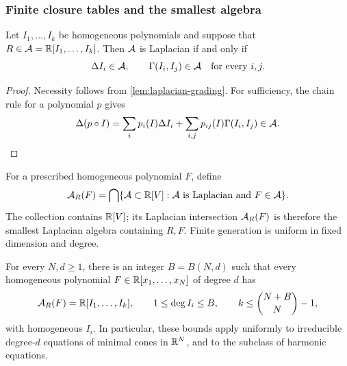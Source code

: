 \subsubsection{Finite closure tables and the smallest algebra}

\begin{proposition}
\label{prop:MR-generator-test}
Let \(I_1,\ldots,I_k\) be homogeneous polynomials and suppose that
\(R\in\mathcal A=\mathbb R[I_1,\ldots,I_k]\). Then \(\mathcal A\) is Laplacian if
and only if
\[
 \Delta I_i\in\mathcal A,\qquad
 \Gamma(I_i,I_j)\in\mathcal A\quad\text{for every }i,j.
\]
\end{proposition}

\begin{proof}
Necessity follows from \cref{lem:laplacian-grading}. For sufficiency,
the chain rule for a polynomial \(p\) gives
\[
 \Delta(p\circ I)=\sum_i p_i(I)\Delta I_i
       +\sum_{i,j}p_{ij}(I)\Gamma(I_i,I_j)\in\mathcal A.
\]
\end{proof}

For a prescribed homogeneous polynomial \(F\), define
\begin{equation}\label{eq:minimal-Laplacian-algebra}
 \mathcal A_R(F)=\bigcap\{\mathcal A\subset\mathbb R[V]:\mathcal A\text{ is Laplacian and }
                                          F\in\mathcal A\}.
\end{equation}
The collection contains \(\mathbb R[V]\); its Laplacian intersection
\(\mathcal A_R(F)\) is therefore the smallest Laplacian algebra containing \(R,F\).
Finite generation is uniform in fixed dimension and degree.

\begin{proposition}
\label{prop:uniform-finite-generation}
For every \(N,d\ge1\), there is an integer \(B=B(N,d)\) such that
every homogeneous polynomial \(F\in\mathbb R[x_1,\ldots,x_N]\) of degree
\(d\) has
\[
 \mathcal A_R(F)=\mathbb R[I_1,\ldots,I_k],\qquad
 1\le\deg I_i\le B,\qquad
 k\le\binom{N+B}{N}-1,
\]
with homogeneous \(I_i\). In particular, these bounds apply uniformly
to irreducible degree-\(d\) equations of minimal cones in \(\mathbb R^N\),
and to the subclass of harmonic equations.
\end{proposition}


